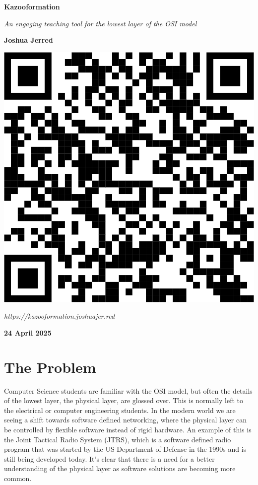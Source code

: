 \documentclass[]{article}
\begin{document}
\setlength{\parskip}{12pt}

\begin{titlepage}
  \begin{center}
  \textbf{\Huge Kazooformation} \par
  \vspace{0.5cm}
  \textit{An engaging teaching tool for the lowest layer of the OSI model} \par
  \vspace{1.5cm}
  \textbf{Joshua Jerred} \par

  \vspace{4cm}
  \includegraphics[width=0.2\linewidth]{images/qr.png} \par
  \textit{https://kazooformation.joshuajer.red}

  \vfill %

   \par
   \par
  \textbf{24 April 2025}

  \end{center}
\end{titlepage}

\section{The Problem}



Computer Science students are familiar with the OSI model, but often the details of the lowest layer, the physical layer, are glossed over. This is normally left to the electrical or computer engineering students. In the modern world we are seeing a shift towards software defined networking, where the physical layer can be controlled by flexible software instead of rigid hardware\cite{ibmWhatSoftwareDefined}. An example of this is the Joint Tactical Radio System (JTRS), which is a software defined radio program that was started by the US Department of Defense in the 1990s and is still being developed today\cite{Cox_2001}. It's clear that there is a need for a better understanding of the physical layer as software solutions are becoming more common.
\end{document}
